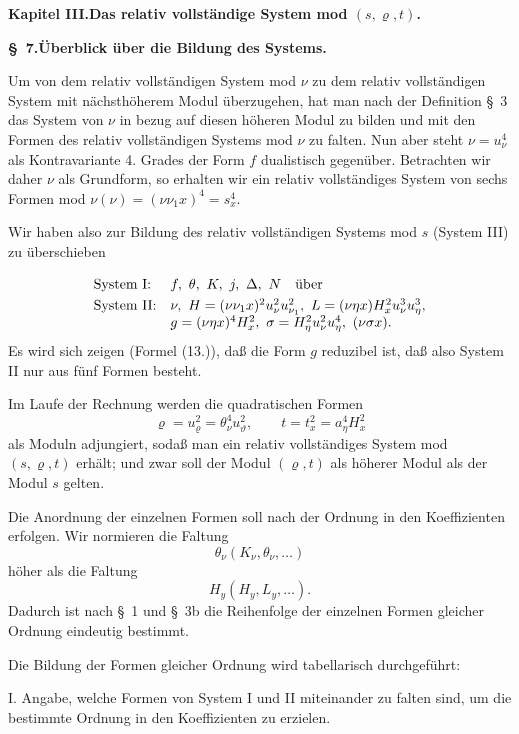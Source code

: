 \documentclass[11pt]{article}
\newcommand{\A}{\Delta}
\begin{document}
\begin{center}
{\Large\bfseries Kapitel III.\quad Das relativ vollständige System mod $(s,\varrho,t)$.}
\end{center}

\begin{center}
\textbf{\S\ 7.\quad Überblick über die Bildung des Systems.}
\end{center}

Um von dem relativ vollständigen System mod $\nu$ zu dem relativ vollständigen System mit nächsthöherem Modul überzugehen, hat man nach der Definition \S\ 3 das System von $\nu$ in bezug auf diesen höheren Modul zu bilden und mit den Formen des relativ vollständigen Systems mod $\nu$ zu falten. Nun aber steht $\nu=u_\nu^4$ als Kontravariante 4. Grades der Form $f$ dualistisch gegenüber. Betrachten wir daher $\nu$ als Grundform, so erhalten wir ein relativ vollständiges System von sechs Formen mod $\nu(\nu)=(\nu\nu_1x)^4=s_x^4$.

Wir haben also zur Bildung des relativ vollständigen Systems mod $s$ (System III) zu überschieben
\[
\begin{array}{ll}
\text{System I:} & f,\ \theta,\ K,\ j,\ \A,\ N\quad \text{über}\vphantom{\dfrac11}\\[0.3em]
\text{System II:} & \nu,\ H=(\nu\nu_1x)^2u_\nu^2u_{\nu_1}^2,\ L=(\nu\eta x)H_x^2u_\nu^3u_\eta^3,\\
& g=(\nu\eta x)^4H_x^2,\ \sigma=H_\eta^2u_\nu^2u_\eta^4,\ (\nu\sigma x).
\end{array}
\]
Es wird sich zeigen (Formel (13.)), daß die Form $g$ reduzibel ist, daß also System II nur aus fünf Formen besteht.

Im Laufe der Rechnung werden die quadratischen Formen
\[
\varrho=u_\varrho^2=\theta_\nu^4u_\vartheta^2,
\qquad
 t=t_x^2=a_\eta^4H_x^2
\]
als Moduln adjungiert, sodaß man ein relativ vollständiges System mod $(s,\varrho,t)$ erhält; und zwar soll der Modul $(\varrho,t)$ als höherer Modul als der Modul $s$ gelten.

Die Anordnung der einzelnen Formen soll nach der Ordnung in den Koeffizienten erfolgen. Wir normieren die Faltung
\[
\theta_\nu(K_\nu,\theta_\nu,\ldots)
\]
höher als die Faltung
\[
H_y(H_y,L_y,\ldots).
\]
Dadurch ist nach \S\ 1 und \S\ 3b die Reihenfolge der einzelnen Formen gleicher Ordnung eindeutig bestimmt.

Die Bildung der Formen gleicher Ordnung wird tabellarisch durchgeführt:

I. Angabe, welche Formen von System I und II miteinander zu falten sind, um die bestimmte Ordnung in den Koeffizienten zu erzielen.
\end{document}
